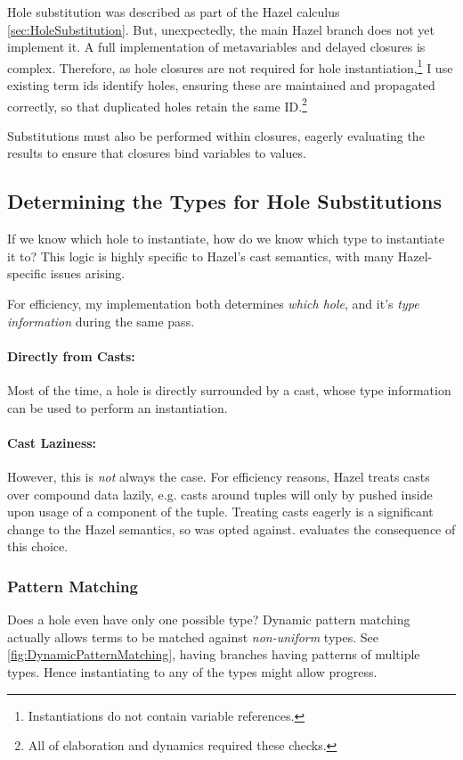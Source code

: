Hole substitution was described as part of the Hazel calculus \cref{sec:HoleSubstitution}. But, unexpectedly, the main Hazel branch does not yet implement it. A full implementation of metavariables and delayed closures is complex. Therefore, as hole closures are not required for hole instantiation,\footnote{Instantiations do not contain variable references.} I use existing term ids identify holes, ensuring these are maintained and propagated correctly, so that duplicated holes retain the same ID.\footnote{All of elaboration and dynamics required these checks.}

Substitutions must also be performed within closures, eagerly evaluating the results to ensure that closures bind variables to values. 

\subsection{Determining the Types for Hole Substitutions}
\label{sec:TypesForHoles}
If we know which hole to instantiate, how do we know which type to instantiate it to? This logic is highly specific to Hazel's cast semantics, with many Hazel-specific issues arising.

For efficiency, my implementation both determines \textit{which hole}, and it's \textit{type information} during the same pass.

\paragraph{Directly from Casts: }
Most of the time, a hole is directly surrounded by a cast, whose type information can be used to perform an instantiation.

\paragraph{Cast Laziness:}\label{sec:CastLaziness}
However, this is \textit{not} always the case. For efficiency reasons, Hazel treats casts over compound data lazily, e.g. casts around tuples will only by pushed inside upon usage of a component of the tuple. Treating casts eagerly is a significant change to the Hazel semantics, so was opted against.  evaluates the consequence of this choice. 


\subsubsection{Pattern Matching}
\label{sec:PatternMatching}
Does a hole even have only one possible type? Dynamic pattern matching actually allows terms to be matched against \textit{non-uniform} types. See \cref{fig:DynamicPatternMatching}, having branches having patterns of multiple types. Hence instantiating to any of the types might allow progress.

